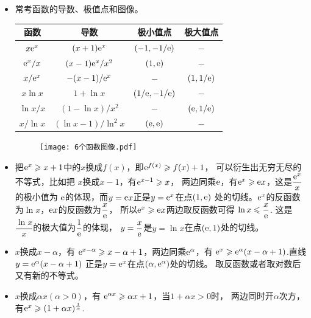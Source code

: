 \begin{itemize}[leftmargin=\inteval{\myitemleftmargin}pt,itemsep=
   \inteval{\myitemitempsep}pt,topsep=\inteval{\myitemtopsep}pt]
\item 常考函数的导数、极值点和图像。
\begin{table}[h]
\centering
\begin{tabular}{c|ccc}
    函数 & 导数 & 极小值点 & 极大值点 \\
    \hline
    $ x\mathrm{e}^x  $ & $(x+1)\mathrm{e}^x  $ & $(-1,-1/\mathrm{e})  $ & $ - $ \\
    $ \mathrm{e}^x/x $ & $ (x-1)\mathrm{e}^x/x^2  $ & $ (1,\mathrm{e}) $ & $ - $ \\
    $ x/\mathrm{e}^x $ & $ -(x-1)/\mathrm{e}^x $ & $ - $ & $ (1,1/\mathrm{e}) $ \\
    $ x\ln x $ & $ 1+\ln x $ & $ (1/\mathrm{e},-1/\mathrm{e})  $ & $ - $ \\
    $ \ln x/x $ & $ (1-\ln x)/x^2  $ & $ - $ & $ (\mathrm{e},1/\mathrm{e})  $ \\
    $ x/\ln x $ & $ (\ln x-1)/\ln^2 x  $ & $ (\mathrm{e},\mathrm{e}) $ & $ - $ 	
\end{tabular}
\end{table} 
\begin{figure}[h]  %
    \centering
    \texttt{[image: 6个函数图像.pdf]}
\end{figure}

\item 把$ \mathrm{e}^x\geqslant x+1 $中的$ x $换成$ f(x) $，即$ \mathrm{e}^{f(x)} \geqslant f(x)+1 $，
可以衍生出无穷无尽的不等式，比如把
$ x $换成$ x-1 $，有$ \mathrm{e}^{x-1}\geqslant x $，
两边同乘$ \mathrm{e} $，有$ \mathrm{e}^x\geqslant \mathrm{e} x $，这是$ \dfrac{\mathrm{e}^x}{x} $的极小值为
$ \mathrm{e} $的体现，而$ y=\mathrm{e} x $正是$ y=\mathrm{e}^x $在点$ (1,\mathrm{e}) $
处的切线。$ \mathrm{e}^x $的反函数为$ \ln x $，$ \mathrm{e} x $的反函数为$ \dfrac{x}{\mathrm{e}} $，
所以$ \mathrm{e}^x\geqslant \mathrm{e} x $两边取反函数可得 $ \ln x\leqslant \dfrac{x}{\mathrm{e}} $.
这是$ \dfrac{\ln x}{x} $的极大值为$ \dfrac{1}{\mathrm{e}} $的体现，
$ y=\dfrac{x}{\mathrm{e}} $是$ y=\ln x $在点$ (\mathrm{e},1) $处的切线。

\item $ x $换成$ x-\alpha $，有
$ \mathrm{e}^{x-\alpha}\geqslant x-\alpha+1 $，两边同乘$ \mathrm{e}^{\alpha} $，有
$ \mathrm{e}^x \geqslant \mathrm{e}^{\alpha}(x-\alpha+1) $.直线$ y=\mathrm{e}^{\alpha}(x-\alpha+1) $
正是$ y=\mathrm{e}^x $在点$ (\alpha,\mathrm{e}^{\alpha}) $处的切线。
取反函数或者取对数后又有新的不等式。

\item $ x $换成$ \alpha x (\alpha>0)$，有
$ \mathrm{e}^{\alpha x}\geqslant \alpha x+1 $，当$ 1+\alpha x>0 $时，
两边同时开$ \alpha $次方，有$ \mathrm{e}^x\geqslant (1+\alpha x)^{\frac{1}{\alpha}} $. 


\end{itemize}
